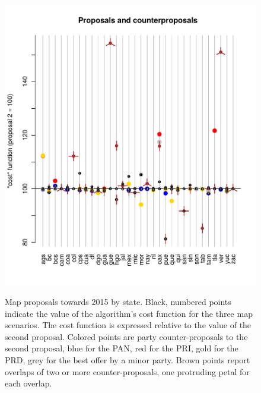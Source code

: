 \documentclass[letter,12pt]{article}
\begin{document}
\begin{figure}
\begin{center}
    \includegraphics[width=\columnwidth]{propsAndCost.pdf} \\
  \caption{Map proposals towards 2015 by state. Black, numbered points indicate the value of the algorithm's cost function for the three map scenarios. The cost function is expressed relative to the value of the second proposal. Colored points are party counter-proposals to the second proposal, blue for the PAN, red for the PRI, gold for the PRD, grey for the best offer by a minor party. Brown points report overlaps of two or more counter-proposals, one protruding petal for each overlap.}\label{F:propsAndCost}
\end{center}
\end{figure}
\end{document}
